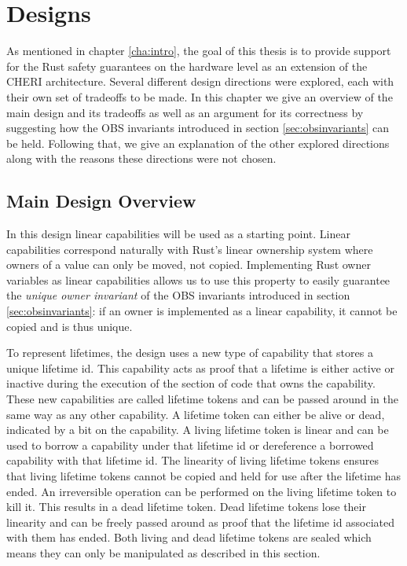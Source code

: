 \chapter{Designs}
\label{chap:design}
As mentioned in chapter \ref{cha:intro}, the goal of this thesis is to provide support for the Rust safety guarantees on the hardware level as an extension of the CHERI architecture. Several different design directions were explored, each with their own set of tradeoffs to be made. In this chapter we give an overview of the main design and its tradeoffs as well as an argument for its correctness by suggesting how the OBS invariants introduced in section \ref{sec:obsinvariants} can be held. Following that, we give an explanation of the other explored directions along with the reasons these directions were not chosen.

\section{Main Design Overview}
\label{sec:maindesign}
In this design linear capabilities will be used as a starting point. Linear capabilities correspond naturally with Rust's linear ownership system where owners of a value can only be moved, not copied. Implementing Rust owner variables as linear capabilities allows us to use this property to easily guarantee the \textit{unique owner invariant} of the OBS invariants introduced in section \ref{sec:obsinvariants}: if an owner is implemented as a linear capability, it cannot be copied and is thus unique.

To represent lifetimes, the design uses a new type of capability that stores a unique lifetime id. This capability acts as proof that a lifetime is either active or inactive during the execution of the section of code that owns the capability. These new capabilities are called lifetime tokens and can be passed around in the same way as any other capability. A lifetime token can either be alive or dead, indicated by a bit on the capability. A living lifetime token is linear and can be used to borrow a capability under that lifetime id or dereference a borrowed capability with that lifetime id. The linearity of living lifetime tokens ensures that living lifetime tokens cannot be copied and held for use after the lifetime has ended. An irreversible operation can be performed on the living lifetime token to kill it. This results in a dead lifetime token. Dead lifetime tokens lose their linearity and can be freely passed around as proof that the lifetime id associated with them has ended. Both living and dead lifetime tokens are sealed which means they can only be manipulated as described in this section.

